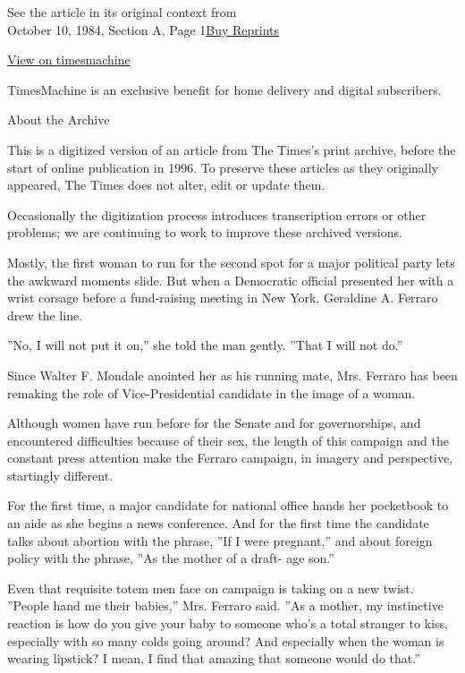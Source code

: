 See the article in its original context from\\
October 10, 1984, Section A, Page
1\href{https://store.nytimes.com/collections/new-york-times-page-reprints?utm_source=nytimes\&utm_medium=article-page\&utm_campaign=reprints}{Buy
Reprints}

\href{http://timesmachine.nytimes.com/timesmachine/1984/10/10/259967.html}{View
on timesmachine}

TimesMachine is an exclusive benefit for home delivery and digital
subscribers.

About the Archive

This is a digitized version of an article from The Times's print
archive, before the start of online publication in 1996. To preserve
these articles as they originally appeared, The Times does not alter,
edit or update them.

Occasionally the digitization process introduces transcription errors or
other problems; we are continuing to work to improve these archived
versions.

Mostly, the first woman to run for the second spot for a major political
party lets the awkward moments slide. But when a Democratic official
presented her with a wrist corsage before a fund-raising meeting in New
York, Geraldine A. Ferraro drew the line.

''No, I will not put it on,'' she told the man gently. ''That I will not
do.''

Since Walter F. Mondale anointed her as his running mate, Mrs. Ferraro
has been remaking the role of Vice-Presidential candidate in the image
of a woman.

Although women have run before for the Senate and for governorships, and
encountered difficulties because of their sex, the length of this
campaign and the constant press attention make the Ferraro campaign, in
imagery and perspective, startingly different.

For the first time, a major candidate for national office hands her
pocketbook to an aide as she begins a news conference. And for the first
time the candidate talks about abortion with the phrase, ''If I were
pregnant,'' and about foreign policy with the phrase, ''As the mother of
a draft- age son.''

Even that requisite totem men face on campaign is taking on a new twist.
''People hand me their babies,'' Mrs. Ferraro said. ''As a mother, my
instinctive reaction is how do you give your baby to someone who's a
total stranger to kiss, especially with so many colds going around? And
especially when the woman is wearing lipstick? I mean, I find that
amazing that someone would do that.''


